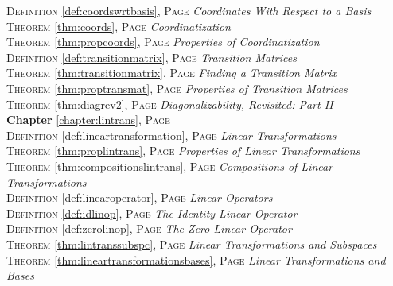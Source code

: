 \begin{multicols}{2}
{\textsc{Definition} \ref{def:coordswrtbasis}, \textsc{Page} \pageref{def:coordswrtbasis} \textit{Coordinates With Respect to a Basis} \\
\textsc{Theorem} \ref{thm:coords}, \textsc{Page} \pageref{thm:coords} \textit{Coordinatization} \\
\textsc{Theorem} \ref{thm:propcoords}, \textsc{Page} \pageref{thm:propcoords} \textit{Properties of Coordinatization} \\
\textsc{Definition} \ref{def:transitionmatrix}, \textsc{Page} \pageref{def:transitionmatrix} \textit{Transition Matrices} \\
\textsc{Theorem} \ref{thm:transitionmatrix}, \textsc{Page} \pageref{thm:transitionmatrix} \textit{Finding a Transition Matrix} \\
\textsc{Theorem} \ref{thm:proptransmat}, \textsc{Page} \pageref{thm:proptransmat} \textit{Properties of Transition Matrices} \\
\textsc{Theorem} \ref{thm:diagrev2}, \textsc{Page} \pageref{thm:diagrev2} \textit{Diagonalizability, Revisited: Part II} \\
\textbf{Chapter} \ref{chapter:lintrans}, \textsc{Page} \pageref{chapter:lintrans} \\
\textsc{Definition} \ref{def:lineartransformation}, \textsc{Page} \pageref{def:lineartransformation} \textit{Linear Transformations} \\
\textsc{Theorem} \ref{thm:proplintrans}, \textsc{Page} \pageref{thm:proplintrans} \textit{Properties of Linear Transformations} \\
\textsc{Theorem} \ref{thm:compositionslintrans}, \textsc{Page} \pageref{thm:compositionslintrans} \textit{Compositions of Linear Transformations} \\
\textsc{Definition} \ref{def:linearoperator}, \textsc{Page} \pageref{def:linearoperator} \textit{Linear Operators} \\
\textsc{Definition} \ref{def:idlinop}, \textsc{Page} \pageref{def:idlinop} \textit{The Identity Linear Operator} \\
\textsc{Definition} \ref{def:zerolinop}, \textsc{Page} \pageref{def:zerolinop} \textit{The Zero Linear Operator} \\
\textsc{Theorem} \ref{thm:lintranssubspc}, \textsc{Page} \pageref{thm:lintranssubspc} \textit{Linear Transformations and Subspaces} \\
\textsc{Theorem} \ref{thm:lineartransformationsbases}, \textsc{Page} \pageref{thm:lineartransformationsbases} \textit{Linear Transformations and Bases} \\
}
\end{multicols}
